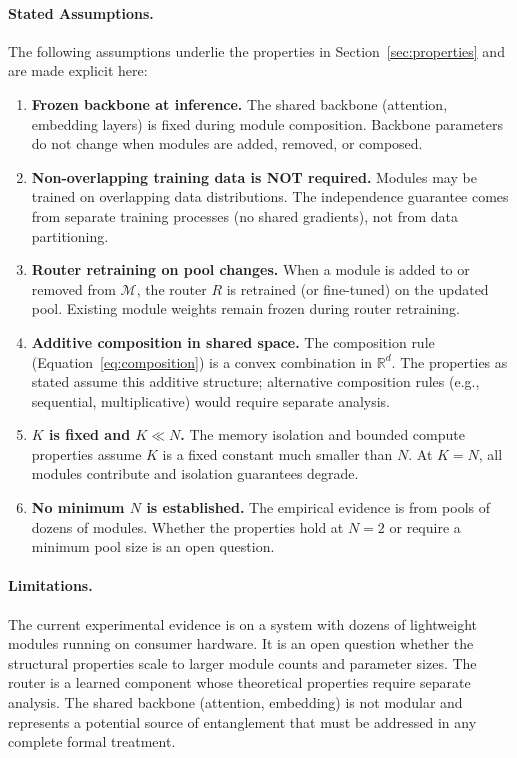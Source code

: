 \documentclass[11pt,a4paper]{article}
\begin{document}
\paragraph{Stated Assumptions.}
The following assumptions underlie the properties in Section~\ref{sec:properties} and are made explicit here:
\begin{enumerate}[nosep,leftmargin=*]
  \item \textbf{Frozen backbone at inference.} The shared backbone (attention, embedding layers) is fixed during module composition. Backbone parameters do not change when modules are added, removed, or composed.
  \item \textbf{Non-overlapping training data is NOT required.} Modules may be trained on overlapping data distributions. The independence guarantee comes from separate training processes (no shared gradients), not from data partitioning.
  \item \textbf{Router retraining on pool changes.} When a module is added to or removed from $\mathcal{M}$, the router $R$ is retrained (or fine-tuned) on the updated pool. Existing module weights remain frozen during router retraining.
  \item \textbf{Additive composition in shared space.} The composition rule (Equation~\ref{eq:composition}) is a convex combination in $\mathbb{R}^d$. The properties as stated assume this additive structure; alternative composition rules (e.g., sequential, multiplicative) would require separate analysis.
  \item \textbf{$K$ is fixed and $K \ll N$.} The memory isolation and bounded compute properties assume $K$ is a fixed constant much smaller than $N$. At $K = N$, all modules contribute and isolation guarantees degrade.
  \item \textbf{No minimum $N$ is established.} The empirical evidence is from pools of dozens of modules. Whether the properties hold at $N = 2$ or require a minimum pool size is an open question.
\end{enumerate}

\paragraph{Limitations.}
The current experimental evidence is on a system with dozens of lightweight modules running on consumer hardware.
It is an open question whether the structural properties scale to larger module counts and parameter sizes.
The router is a learned component whose theoretical properties require separate analysis.
The shared backbone (attention, embedding) is not modular and represents a potential source of entanglement that must be addressed in any complete formal treatment.
\end{document}
